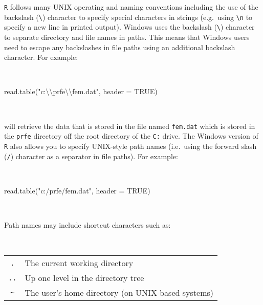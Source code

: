 \documentclass[
  12pt,
  a4paper]{book}
\newenvironment{Shaded}{\begin{snugshade}}{\end{snugshade}}
\newcommand{\AttributeTok}[1]{\textcolor[rgb]{0.77,0.63,0.00}{#1}}
\newcommand{\ConstantTok}[1]{\textcolor[rgb]{0.00,0.00,0.00}{#1}}
\newcommand{\FunctionTok}[1]{\textcolor[rgb]{0.00,0.00,0.00}{#1}}
\newcommand{\NormalTok}[1]{#1}
\newcommand{\SpecialCharTok}[1]{\textcolor[rgb]{0.00,0.00,0.00}{#1}}
\newcommand{\StringTok}[1]{\textcolor[rgb]{0.31,0.60,0.02}{#1}}
\begin{document}
\texttt{R} follows many UNIX operating and naming conventions including the use of the backslash (\texttt{\textbackslash{}}) character to specify special characters in strings (e.g.~using \texttt{\textbackslash{}n} to specify a new line in printed output). Windows uses the backslash (\texttt{\textbackslash{}}) character to separate directory and file names in paths. This means that Windows users need to escape any backslashes in file paths using an additional backslash character. For example:

~

\begin{Shaded}
\begin{Highlighting}[]
\FunctionTok{read.table}\NormalTok{(}\StringTok{"c:}\SpecialCharTok{\textbackslash{}\textbackslash{}}\StringTok{prfe}\SpecialCharTok{\textbackslash{}\textbackslash{}}\StringTok{fem.dat"}\NormalTok{, }\AttributeTok{header =} \ConstantTok{TRUE}\NormalTok{)}
\end{Highlighting}
\end{Shaded}

~

will retrieve the data that is stored in the file named \texttt{fem.dat} which is stored in the \texttt{prfe} directory off the root directory of the \texttt{C:} drive. The Windows version of \texttt{R} also allows you to specify UNIX-style path names (i.e.~using the forward slash (\texttt{/}) character as a separator in file paths). For example:

~

\begin{Shaded}
\begin{Highlighting}[]
\FunctionTok{read.table}\NormalTok{(}\StringTok{"c:/prfe/fem.dat"}\NormalTok{, }\AttributeTok{header =} \ConstantTok{TRUE}\NormalTok{)}
\end{Highlighting}
\end{Shaded}

~

Path names may include shortcut characters such as:

~

\begin{longtable}[]{@{}cl@{}}
\toprule
\endhead
\texttt{.} & The current working directory \\
\texttt{..} & Up one level in the directory tree \\
\texttt{\textasciitilde{}} & The user's home directory (on UNIX-based systems) \\
\bottomrule
\end{longtable}
\end{document}
